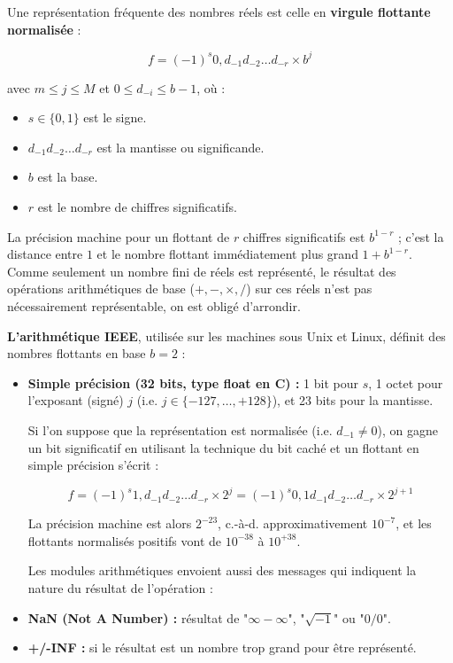 Une représentation fréquente des nombres réels est celle en \textbf{virgule flottante normalisée} :

$$
f = (-1)^s 0, d_{-1}d_{-2} \dots d_{-r} \times b^j
$$

avec $m \leq j \leq M$ et $0 \leq d_{-i} \leq b - 1$, où :
\begin{itemize}
\item $s \in \{0, 1\}$ est le signe.
\item $d_{-1}d_{-2} \dots d_{-r}$ est la mantisse ou significande.
\item $b$ est la base.
\item $r$ est le nombre de chiffres significatifs.
\end{itemize}

La précision machine pour un flottant de $r$ chiffres significatifs est $b^{1-r}$ ; c’est la distance entre $1$ et le nombre flottant immédiatement plus grand $1 + b^{1-r}$. Comme seulement un nombre fini de réels est représenté, le résultat des opérations arithmétiques de base ($+, -, \times, /$) sur ces réels n’est pas nécessairement représentable, on est obligé d’arrondir.

\textbf{L’arithmétique IEEE}, utilisée sur les machines sous Unix et Linux, définit des nombres flottants en base $b = 2$ :

\begin{itemize}
\item \textbf{Simple précision (32 bits, type float en C) :} 1 bit pour $s$, 1 octet pour l’exposant (signé) $j$ (i.e. $j \in \{-127, \dots, +128\}$), et 23 bits pour la mantisse.

Si l’on suppose que la représentation est normalisée (i.e. $d_{-1} \neq 0$), on gagne un bit significatif en utilisant la technique du bit caché et un flottant en simple précision s’écrit :

$$
f = (-1)^s 1, d_{-1}d_{-2} \dots d_{-r} \times 2^j = (-1)^s 0, 1d_{-1}d_{-2} \dots d_{-r} \times 2^{j+1}
$$

La précision machine est alors $2^{-23}$, c.-à-d. approximativement $10^{-7}$, et les flottants normalisés positifs vont de $10^{-38}$ à $10^{+38}$.

Les modules arithmétiques envoient aussi des messages qui indiquent la nature du résultat de l’opération :
\item \textbf{NaN (Not A Number) :} résultat de "$\infty - \infty$", "$\sqrt{-1}$" ou "$0/0$".
\item \textbf{+/-INF :} si le résultat est un nombre trop grand pour être représenté.
\end{itemize}

